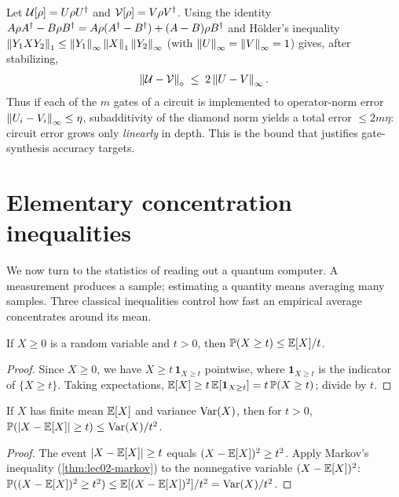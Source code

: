 \begin{example}\label{exa:lec02-unidiamond}
Let $\mathcal{U}[\rho]=U\rho U^{\dagger}$ and $\mathcal{V}[\rho]=V\rho V^{\dagger}$. Using the
identity $A\rho A^{\dagger}-B\rho B^{\dagger}=A\rho(A^{\dagger}-B^{\dagger})+(A-B)\rho B^{\dagger}$ and H\"older's
inequality $\left\lVert Y_1 X Y_2 \right\rVert_1\le\left\lVert Y_1 \right\rVert_\infty\left\lVert X \right\rVert_1\left\lVert Y_2 \right\rVert_\infty$
(with $\left\lVert U \right\rVert_\infty=\left\lVert V \right\rVert_\infty=1$) gives, after stabilizing,
\begin{equation}\label{eq:lec02-unidiamond}
  \left\lVert \mathcal{U}-\mathcal{V} \right\rVert_\diamond\;\le\;2\left\lVert U-V \right\rVert_\infty .
\end{equation}
Thus if each of the $m$ gates of a circuit is implemented to operator-norm error
$\left\lVert U_i-V_i \right\rVert_\infty\le\eta$, subadditivity of the diamond norm yields a total
error $\le 2m\eta$: circuit error grows only \emph{linearly} in depth. This is the
bound that justifies gate-synthesis accuracy targets.
\end{example}

\section{Elementary concentration inequalities}
\label{sec:lec02-3}

We now turn to the statistics of reading out a quantum computer. A measurement
produces a sample; estimating a quantity means averaging many samples. Three
classical inequalities control how fast an empirical average concentrates around
its mean.

\begin{theorem}\label{thm:lec02-markov}
If $X\ge0$ is a random variable and $t>0$, then $\mathbb{P}(X\ge t)\le\mathbb{E}[X]/t$.
\end{theorem}

\begin{proof}
Since $X\ge0$, we have $X\ge t\,\mathbf{1}_{X\ge t}$ pointwise, where
$\mathbf{1}_{X\ge t}$ is the indicator of $\{X\ge t\}$. Taking expectations,
$\mathbb{E}[X]\ge t\,\mathbb{E}[\mathbf{1}_{X\ge t}]=t\,\mathbb{P}(X\ge t)$; divide by $t$.
\end{proof}

\begin{theorem}\label{thm:lec02-cheb}
If $X$ has finite mean $\mathbb{E}[X]$ and variance $\operatorname{Var}(X)$, then for $t>0$,
$\mathbb{P}(\left\lvert X-\mathbb{E}[X] \right\rvert\ge t)\le\operatorname{Var}(X)/t^{2}$.
\end{theorem}

\begin{proof}
The event $\left\lvert X-\mathbb{E}[X] \right\rvert\ge t$ equals $(X-\mathbb{E}[X])^{2}\ge t^{2}$. Apply Markov's
inequality (\cref{thm:lec02-markov}) to the nonnegative variable $(X-\mathbb{E}[X])^{2}$:
$\mathbb{P}((X-\mathbb{E}[X])^{2}\ge t^{2})\le\mathbb{E}[(X-\mathbb{E}[X])^{2}]/t^{2}=\operatorname{Var}(X)/t^{2}$.
\end{proof}


